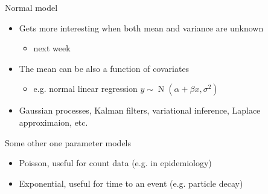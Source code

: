 \documentclass[english,t]{beamer}
\DeclareMathOperator{\N}{N}
\begin{document}
\begin{frame}{Normal model}

  \begin{itemize}
  \item Gets more interesting when both mean and variance are unknown
    \begin{itemize}
    \item next week
    \end{itemize}
  \item<2-> The mean can be also a function of covariates
    \begin{itemize}
    \item e.g. normal linear regression $y \sim \N(\alpha + \beta x, \sigma^2)$
    \end{itemize}
  \item<3-> Gaussian processes, Kalman filters, variational
    inference, Laplace approximaion, etc.
  \end{itemize}
\end{frame}

\begin{frame}{Some other one parameter models}

  \begin{itemize}
  \item Poisson, useful for count data (e.g. in epidemiology)
  \item Exponential, useful for time to an event (e.g. particle decay)
  \end{itemize}
  
\end{frame}
\end{document}
